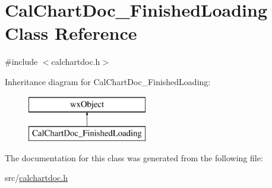 \hypertarget{a00021}{\section{Cal\-Chart\-Doc\-\_\-\-Finished\-Loading Class Reference}
\label{a00021}
}


{\ttfamily \#include $<$calchartdoc.\-h$>$}

Inheritance diagram for Cal\-Chart\-Doc\-\_\-\-Finished\-Loading\-:\begin{figure}[H]
\begin{center}
\leavevmode
\includegraphics[height=2.000000cm]{a00021}
\end{center}
\end{figure}


The documentation for this class was generated from the following file\-:\begin{DoxyCompactItemize}
\item 
src/\hyperlink{a00181}{calchartdoc.\-h}\end{DoxyCompactItemize}
